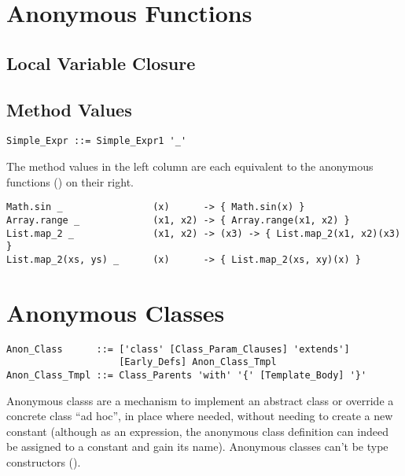 \section{Anonymous Functions}
\label{sec:anonymous-functions}

\subsection{Local Variable Closure}
\label{sec:local-variable-closure}

\subsection{Method Values}

\syntax\begin{lstlisting}
Simple_Expr ::= Simple_Expr1 '_'
\end{lstlisting}

\example The method values in the left column are each equivalent to the anonymous functions () on their right. 
\begin{lstlisting}[deletekeywords={range}]
Math.sin _                (x)      -> { Math.sin(x) }
Array.range _             (x1, x2) -> { Array.range(x1, x2) }
List.map_2 _              (x1, x2) -> (x3) -> { List.map_2(x1, x2)(x3) }
List.map_2(xs, ys) _      (x)      -> { List.map_2(xs, xy)(x) }
\end{lstlisting}







\section{Anonymous Classes}
\label{sec:anonymous-classes}

\syntax\begin{lstlisting}
Anon_Class      ::= ['class' [Class_Param_Clauses] 'extends'] 
                    [Early_Defs] Anon_Class_Tmpl
Anon_Class_Tmpl ::= Class_Parents 'with' '{' [Template_Body] '}'
\end{lstlisting}

Anonymous classs are a mechanism to implement an abstract class or override a concrete class ``ad hoc'', in place where needed, without needing to create a new constant (although as an expression, the anonymous class definition can indeed be assigned to a constant and gain its name). Anonymous classes can't be type constructors (). 

